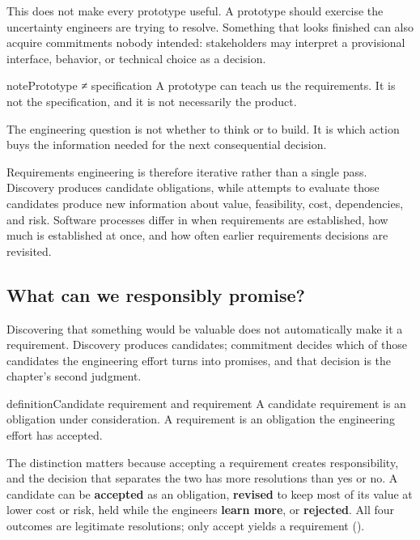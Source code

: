 This does not make every prototype useful. A prototype should exercise the uncertainty engineers are
trying to resolve. Something that looks finished can also acquire commitments nobody intended:
stakeholders may interpret a provisional interface, behavior, or technical choice as a decision.

\begin{bookbox}{note}{Prototype ≠ specification} %
A prototype can teach us the requirements. It is not the specification, and it is not necessarily
the product.
\end{bookbox}

The engineering question is not whether to think or to build. It is which action buys the
information needed for the next consequential decision.

Requirements engineering is therefore iterative rather than a single pass.
Discovery produces candidate obligations, while attempts to evaluate those candidates produce new information about value, feasibility, cost, dependencies, and risk.
Software processes differ in when requirements are established, how much is established at once, and how often earlier requirements decisions are revisited.

\subsection{What can we responsibly promise?}\label{sec-candidate-to-commitment}

Discovering that something would be valuable does not automatically make it a requirement.
Discovery produces candidates; commitment decides which of those candidates the engineering effort turns into promises, and that decision is the chapter's second judgment.

\begin{bookbox}{definition}{Candidate requirement and requirement} %
A candidate requirement is an obligation under consideration. A requirement is an obligation the
engineering effort has accepted.
\end{bookbox}

The distinction matters because accepting a requirement creates responsibility, and the decision
that separates the two has more resolutions than yes or no. A candidate can be \textbf{accepted} as an
obligation, \textbf{revised} to keep most of its value at lower cost or risk, held while the engineers
\textbf{learn more}, or \textbf{rejected}. All four outcomes are legitimate resolutions; only accept yields a
requirement (\citet{fig-commitment-decision}).

